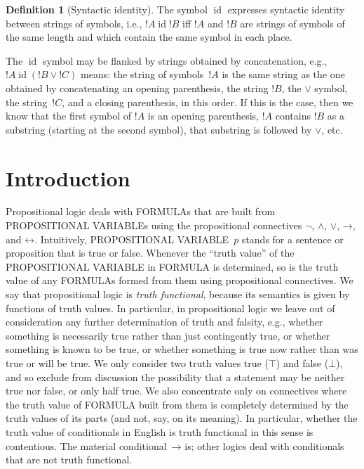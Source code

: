 \documentclass[10pt,a4paper]{article}
\newcommand*{\olup}[1]{\MakeUppercase{#1}}
\theoremstyle{plain}
\theoremstyle{definition}
\newtheorem{defn}[thm]{Definition}
\theoremstyle{remark}
\newcommand*{\olfileid}[3]{}
\newcommand*{\olsection}[1]{\section*{#1}}
\providecommand{\lif}{\mathbin{\rightarrow}}
\providecommand{\True}{\top}
\providecommand{\False}{\bot}
\providecommand{\liff}{\mathbin{\leftrightarrow}}
\providecommand{\ident}{\operatorname{id}}
\begin{document}
\begin{defn}[Syntactic identity]
The symbol $\ident$ expresses syntactic identity between strings of
symbols, i.e., $!A \ident !B$ iff $!A$ and $!B$ are strings of symbols
of the same length and which contain the same symbol in each place.
\end{defn}

The $\ident$ symbol may be flanked by strings obtained by
concatenation, e.g., $!A \ident (!B \lor !C)$ means: the string of
symbols~$!A$ is the same string as the one obtained by concatenating
an opening parenthesis, the string $!B$, the $\lor$ symbol, the
string~$!C$, and a closing parenthesis, in this order. If this is the
case, then we know that the first symbol of $!A$ is an opening
parenthesis, $!A$ contains $!B$ as a substring (starting at the second
symbol), that substring is followed by $\lor$, etc.





\olfileid{pl}{syn}{int}

\olsection{Introduction}

Propositional logic deals with \olup{formula}s that are built from
\olup{propositional variable}s using the propositional connectives
$\lnot$, $\land$, $\lor$, $\lif$, and $\liff$.  Intuitively,
\olup{propositional variable}~$p$ stands for a sentence or proposition
that is true or false. Whenever the ``truth value'' of the
\olup{propositional variable} in \olup{formula} is determined, so is the
truth value of any \olup{formula}s formed from them using propositional
connectives.  We say that propositional logic is \emph{truth
  functional}, because its semantics is given by functions of truth
values. In particular, in propositional logic we leave out of
consideration any further determination of truth and falsity, e.g.,
whether something is necessarily true rather than just contingently
true, or whether something is known to be true, or whether something
is true now rather than was true or will be true.  We only consider
two truth values true ($\True$) and false ($\False$), and so exclude
from discussion the possibility that a statement may be neither true
nor false, or only half true. We also concentrate only on connectives where
the truth value of \olup{formula} built from them is completely
determined by the truth values of its parts (and not, say, on its
meaning). In particular, whether the truth value of conditionals in
English is truth functional in this sense is contentious. The material
conditional~$\lif$ is; other logics deal with conditionals that are
not truth functional.
\end{document}
